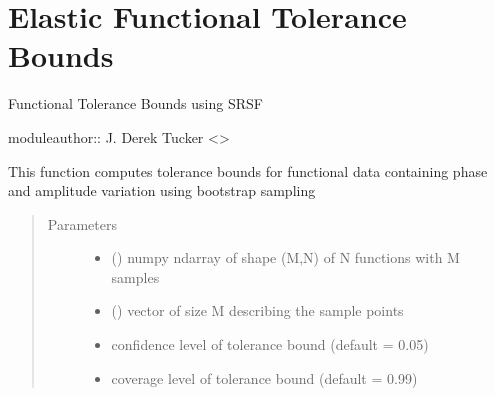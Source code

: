 \documentclass[letterpaper,10pt,english]{sphinxmanual}
\begin{document}
\chapter{Elastic Functional Tolerance Bounds}
\label{\detokenize{tolerance:module-tolerance}}\label{\detokenize{tolerance:elastic-functional-tolerance-bounds}}\label{\detokenize{tolerance::doc}}
Functional Tolerance Bounds using SRSF

moduleauthor:: J. Derek Tucker \textless{}\textgreater{}

\begin{fulllineitems}
\label{\detokenize{tolerance:tolerance.bootTB}}
This function computes tolerance bounds for functional data containing
phase and amplitude variation using bootstrap sampling
\begin{quote}\begin{description}
\item[{Parameters}] \leavevmode\begin{itemize}
\item {} 
 () \textendash{} numpy ndarray of shape (M,N) of N functions with M samples

\item {} 
 () \textendash{} vector of size M describing the sample points

\item {} 
 \textendash{} confidence level of tolerance bound (default = 0.05)

\item {} 
 \textendash{} coverage level of tolerance bound (default = 0.99)


\end{itemize}
\end{description}
\end{quote}
\end{fulllineitems}
\end{document}
